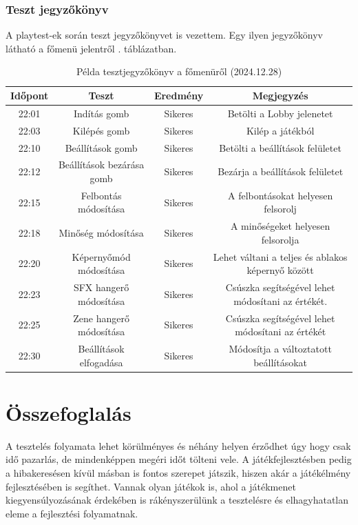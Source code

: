 \documentclass[]{thesis-ekf}
\theoremstyle{definition}
\theoremstyle{remark}
\begin{document}
\subsubsection{Teszt jegyzőkönyv}

A playtest-ek során teszt jegyzőkönyvet is vezettem. Egy ilyen jegyzőkönyv látható a főmenü jelentről . táblázatban.

\begin{table}[ht!]
	\centering
	\footnotesize
	\begin{tabular}{|c|c|c|c|}
		\hline
		\textbf{Időpont} & \textbf{Teszt} & \textbf{Eredmény} & \textbf{Megjegyzés} \\
		\hline
		22:01 & Indítás gomb & Sikeres & Betölti a Lobby jelenetet \\
        \hline
		22:03 & Kilépés gomb & Sikeres & Kilép a játékból \\
		\hline
		22:10 & Beállítások gomb & Sikeres & Betölti a beállítások felületet \\
		\hline
		22:12 & Beállítások bezárása gomb & Sikeres & Bezárja a beállítások felületet \\
		\hline
		22:15 & Felbontás módosítása & Sikeres & A felbontásokat helyesen felsorolj \\
		\hline
		22:18 & Minőség módosítása & Sikeres & A minőségeket helyesen felsorolja \\
		\hline
		22:20 & Képernyőmód módosítása & Sikeres & Lehet váltani a teljes és ablakos képernyő között \\
		\hline
		22:23 & SFX hangerő módosítása & Sikeres & Csúszka segítségével lehet módosítani az értékét. \\
		\hline
		22:25 & Zene hangerő módosítása & Sikeres & Csúszka segítségével lehet módosítani az értékét \\
		\hline
		22:30 & Beállítások elfogadása & Sikeres & Módosítja a változtatott beállításokat \\
		\hline
	\end{tabular}
	\caption{Példa tesztjegyzőkönyv a főmenüről (2024.12.28)}
	\label{tab-tesztjegyzokonyv}
\end{table}

\section{Összefoglalás}

A tesztelés folyamata lehet körülményes és néhány helyen érződhet úgy hogy csak idő pazarlás, de mindenképpen megéri időt tölteni vele. A játékfejlesztésben pedig a hibakeresésen kívül másban is fontos szerepet játszik, hiszen akár a játékélmény fejlesztésében is segíthet. Vannak olyan játékok is, ahol a játékmenet kiegyensúlyozásának érdekében is rákényszerülünk a tesztelésre és elhagyhatatlan eleme a fejlesztési folyamatnak.
\end{document}
